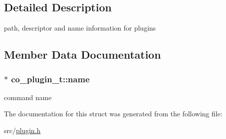 \subsection{Detailed Description}
path, descriptor and name information for plugins 

\subsection{Member Data Documentation}
\hypertarget{structco__plugin__t_a6d404dac4735db73f208778f2eddd1e2}{
\subsubsection[{name}]{$\ast$ co\-\_\-plugin\-\_\-t\-::name}}\label{structco__plugin__t_a6d404dac4735db73f208778f2eddd1e2}
command name 

The documentation for this struct was generated from the following file\-:\begin{DoxyCompactItemize}
\item 
src/\hyperlink{plugin_8h}{plugin.\-h}\end{DoxyCompactItemize}
